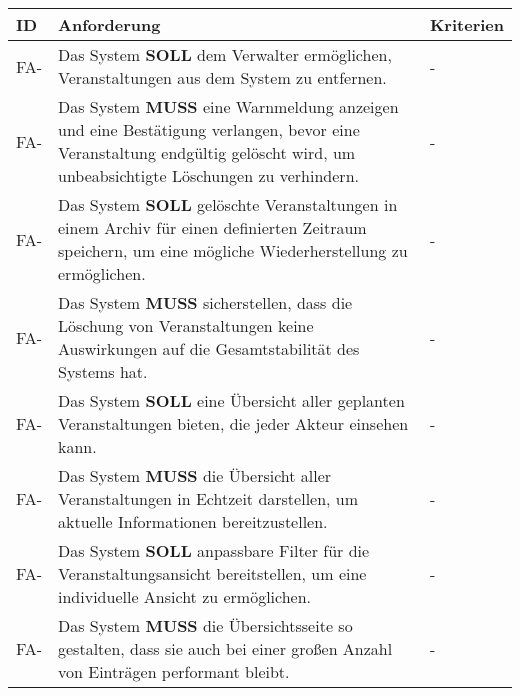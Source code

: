 \newpage

\begin{tabular} {|p{}|p{11cm}|p{}|}
	\hline
	ID & Anforderung & Kriterien \\
	\hline
	FA-
	& Das System \textbf{SOLL} dem Verwalter ermöglichen, Veranstaltungen aus dem System zu entfernen. 
	& - \\
	\hline
	FA-
	& Das System \textbf{MUSS} eine Warnmeldung anzeigen und eine Bestätigung verlangen, bevor eine Veranstaltung endgültig gelöscht wird, um unbeabsichtigte Löschungen zu verhindern. 
	& - \\
	\hline
	FA-
	& Das System \textbf{SOLL} gelöschte Veranstaltungen in einem Archiv für einen definierten Zeitraum speichern, um eine mögliche Wiederherstellung zu ermöglichen. 
	& - \\
	\hline
	FA-
	& Das System \textbf{MUSS} sicherstellen, dass die Löschung von Veranstaltungen keine Auswirkungen auf die Gesamtstabilität des Systems hat. 
	& - \\
	\hline
	FA-
	& Das System \textbf{SOLL} eine Übersicht aller geplanten Veranstaltungen bieten, die jeder Akteur einsehen kann. 
	& - \\
	\hline
	FA-
	& Das System \textbf{MUSS} die Übersicht aller Veranstaltungen in Echtzeit darstellen, um aktuelle Informationen bereitzustellen. 
	& - \\
	\hline
	FA-
	& Das System \textbf{SOLL} anpassbare Filter für die Veranstaltungsansicht bereitstellen, um eine individuelle Ansicht zu ermöglichen. 
	& - \\
	\hline
	FA-
	& Das System \textbf{MUSS} die Übersichtsseite so gestalten, dass sie auch bei einer großen Anzahl von Einträgen performant bleibt. 
	& - \\
	\hline
\end{tabular}

\newpage

